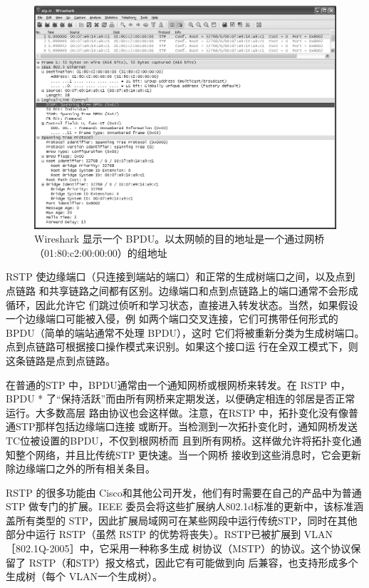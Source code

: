 \begin{figure}
    \centering
    \includegraphics[scale=0.5]{imgs/3/3-16.png}
    \caption{Wireshark 显示一个 BPDU。以太网帧的目的地址是一个通过网桥（01:80:c2:00:00:00）的组地址}
\end{figure}

RSTP 使边缘端口（只连接到端站的端口）和正常的生成树端口之间，以及点到点链路
和共享链路之间都有区别。边缘端口和点到点链路上的端口通常不会形成循环，因此允许它
们跳过侦听和学习状态，直接进入转发状态。当然，如果假设一个边缘端口可能被入侵，例
如两个端口交叉连接，它们可携带任何形式的BPDU（简单的端站通常不处理 BPDU），这时
它们将被重新分类为生成树端口。点到点链路可根据接口操作模式来识别。如果这个接口运
行在全双工模式下，则这条链路是点到点链路。

在普通的STP 中，BPDU通常由一个通知网桥或根网桥来转发。在 RSTP 中，BPDU *
了“保持活跃”而由所有网桥来定期发送，以便确定相连的邻居是否正常运行。大多数高层
路由协议也会这样做。注意，在RSTP 中，拓扑变化没有像普通STP那样包括边缘端口连接
或断开。当检测到一次拓扑变化时，通知网桥发送TC位被设置的BPDU，不仅到根网桥而
且到所有网桥。这样做允许将拓扑变化通知整个网络，并且比传统STP 更快速。当一个网桥
接收到这些消息时，它会更新除边缘端口之外的所有相关条目。

RSTP 的很多功能由 Cisco和其他公司开发，他们有时需要在自己的产品中为普通STP
做专门的扩展。IEEE 委员会将这些扩展纳人802.1d标准的更新中，该标准涵盖所有类型的
STP，因此扩展局域网可在某些网段中运行传统STP，同时在其他部分中运行 RSTP（虽然
RSTP 的优势将丧失）。RSTP已被扩展到 VLAN［802.1Q-2005］中，它采用一种称多生成
树协议（MSTP）的协议。这个协议保留了 RSTP（和STP）报文格式，因此它有可能做到向
后兼容，也支持形成多个生成树（每个 VLAN一个生成树）。

